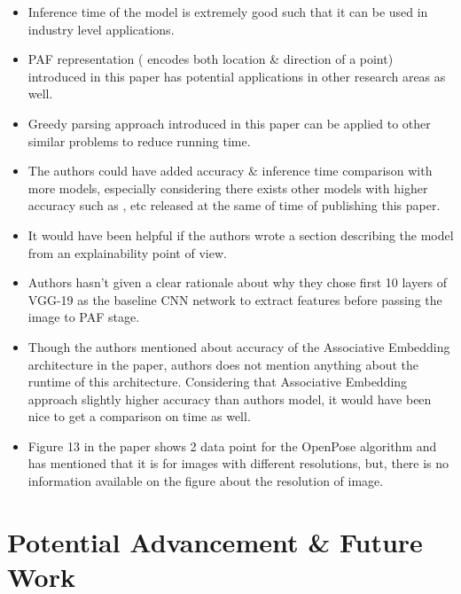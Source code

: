 \documentclass[twocolumn]{article}
\begin{document}
\begin{itemize}
	\item Inference time of the model is extremely good such that it can be used in industry level applications.
	\item PAF representation ( encodes both location \& direction of a point) introduced in this paper has potential applications in other research areas as well.
	\item Greedy parsing approach introduced in this paper can be applied to other similar problems to reduce running time.
\end{itemize}

\begin{itemize}
	\item The authors could have added accuracy \& inference time comparison with more models, especially considering there exists other models with higher accuracy such as \cite{ning2017knowledge},\cite{ke2018multi} etc released at the same of time of publishing this paper.
	\item It would have been helpful if the authors wrote a section describing the model from an explainability point of view.
\end{itemize}

\begin{itemize}
	\item Authors hasn't given a clear rationale about why they chose first 10 layers of VGG-19 as the baseline CNN network to extract features before passing the image to PAF stage.
	\item Though the authors mentioned about accuracy of the Associative Embedding architecture\cite{newell2017associative} in the paper, authors does not mention anything about the runtime of this architecture. Considering that Associative Embedding approach slightly higher accuracy than authors model, it would have been nice to get a comparison on time as well.
	\item Figure 13 in the paper shows 2 data point for the OpenPose algorithm and has mentioned that it is for images with different resolutions, but, there is no information available on the figure about the resolution of image.
\end{itemize}


\section{Potential Advancement \& Future Work}
\end{document}
